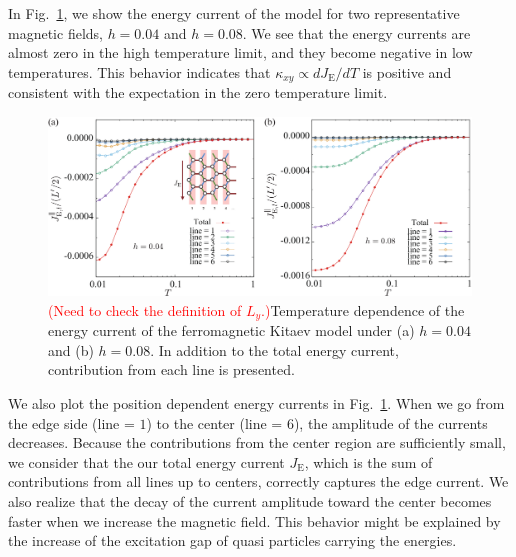\documentclass[reprint,amsmath,amssymb,aps,prx]{revtex4-2}
\begin{document}
In Fig.~\ref{fig:J_line}, we show the energy current of the model for two representative magnetic fields, $h=0.04$ and $h=0.08$. We see that the energy currents are almost zero in the high temperature limit, and they become negative in low temperatures. This behavior indicates that $\kappa_{xy} \propto d J_{\mathrm{E}}/d T$ is positive and consistent with the expectation in the zero temperature limit. 
\begin{figure}
  \begin{center}
    \includegraphics[width=0.9\linewidth]{Figs/J_line_all.pdf}
  \end{center}
  \caption{\textcolor{red}{(Need to check the definition of $L_y$.)}Temperature dependence of the energy current of the ferromagnetic Kitaev model under (a) $h=0.04$ and (b) $h=0.08$. In addition to the total energy current, contribution from each line is presented.}
  \label{fig:J_line}
\end{figure}

We also plot the position dependent energy currents in Fig.~\ref{fig:J_line}. When we go from the edge side (line = $1$) to the center (line = $6$), the amplitude of the currents decreases. Because the contributions from the center region are sufficiently small, we consider that the our total energy current $J_{\mathrm{E}}$, which is the sum of contributions from all lines up to centers, correctly captures the edge current. We also realize that the decay of the current amplitude toward the center becomes faster when we increase the magnetic field. This behavior might be explained by the increase of the excitation gap of quasi particles carrying the energies. 
\end{document}
